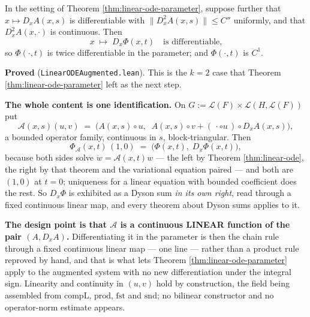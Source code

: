 \begin{theorem}
  \label{thm:linear-ode-augmented}
  \leanok
  In the setting of Theorem \ref{thm:linear-ode-parameter}, suppose further that
  $x \mapsto D_xA(x,s)$ is differentiable with $\|D_x^2A(x,s)\| \le C''$ uniformly, and that
  $D_x^2A(x,\cdot)$ is continuous. Then
  \[
    x \;\longmapsto\; D_x\Phi(x,t) \quad\text{is differentiable,}
  \]
  so $\Phi(\cdot,t)$ is twice differentiable in the parameter; and $\Phi(\cdot,t)$ is $C^1$.

  \textbf{Proved} (\texttt{LinearODEAugmented.lean}). This is the $k=2$ case that
  Theorem \ref{thm:linear-ode-parameter} left as the next step.

  \textbf{The whole content is one identification.} On
  $G := \mathcal{L}(F) \times \mathcal{L}(H,\mathcal{L}(F))$ put
  \[
    \mathcal{A}(x,s)(u,v) \;=\; \big(A(x,s)\circ u,\;\; A(x,s)\circ v
      + (\,\cdot\circ u\,)\circ D_xA(x,s)\big),
  \]
  a bounded operator family, continuous in $s$, block-triangular. Then
  \[
    \Phi_{\mathcal{A}}(x,t)\,(1,0) \;=\; \big(\Phi(x,t),\; D_x\Phi(x,t)\big),
  \]
  because both sides solve $\dot w = \mathcal{A}(x,t)w$ --- the left by Theorem
  \ref{thm:linear-ode}, the right by that theorem and the variational equation paired --- and
  both are $(1,0)$ at $t=0$; uniqueness for a linear equation with bounded coefficient does the
  rest. So $D_x\Phi$ is exhibited as a Dyson sum \emph{in its own right}, read through a fixed
  continuous linear map, and every theorem about Dyson sums applies to it.

  \textbf{The design point is that $\mathcal{A}$ is a continuous LINEAR function of the pair
  $(A, D_xA)$.} Differentiating it in the parameter is then the chain rule through a fixed
  continuous linear map --- one line --- rather than a product rule reproved by hand, and that
  is what lets Theorem \ref{thm:linear-ode-parameter} apply to the augmented system with no new
  differentiation under the integral sign. Linearity and continuity in $(u,v)$ hold by
  construction, the field being assembled from $\mathrm{compL}$, $\mathrm{prod}$, $\mathrm{fst}$
  and $\mathrm{snd}$; no bilinear constructor and no operator-norm estimate appears.


\end{theorem}
